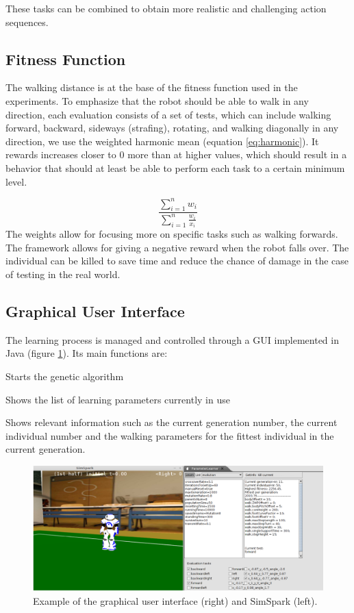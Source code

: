 \documentclass{article}
\begin{document}
These tasks can be combined to obtain more realistic and challenging action sequences.

\subsection{Fitness Function}

The walking distance is at the base of the fitness function used in the 
experiments. To emphasize that the robot should be able to walk in any 
direction, each evaluation consists of a set of tests, which can include
walking forward, backward, sideways (strafing), rotating, and walking
diagonally in any direction, we use the weighted harmonic mean (equation
\ref{eq:harmonic}). It rewards increases closer to 0 more than at higher
values, which should result in a behavior that should at least be able to
perform each task to a certain minimum level.

\begin{equation}
	\frac{\sum^{n}_{i=1} w_i} {\sum^{n}_{i=1}\frac{w_i}{x_i}}
    \label{eq:harmonic}
\end{equation}
The weights allow for focusing more on specific tasks such as walking forwards.
The framework allows for giving a negative reward when the robot falls over.
The individual can be killed to save time and reduce the chance of damage in
the case of testing in the real world.
\subsection{Graphical User Interface}
The learning process is managed and controlled through a GUI implemented in Java (figure \ref{fig:gui}). 
Its main functions are:

\begin{description}
\setlength{\itemsep}{-2pt}
\item[Learn] Starts the genetic algorithm
\item[List] Shows the list of learning parameters currently in use
\item[GetInfo] Shows relevant information such as the current generation number, the current individual number and the walking parameters for the fittest individual in the current generation.
\end{description}


\begin{figure}[h!]
	\center
	\includegraphics[width=\textwidth]{images/GUI}
	\caption{Example of the graphical user interface (right) and SimSpark (left).}
	\label{fig:gui}
\end{figure}
\end{document}
